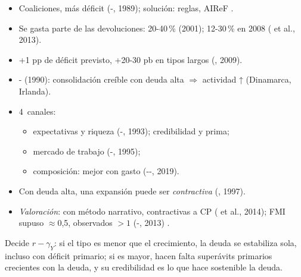 \documentclass{article}
\begin{document}
\begin{columnas}
\begin{itemize}
\begin{enumerate}
  \item \emph{deuda estratégica} (-, 1989; -, 1990);
  \item \emph{fondo común} (--, 1981): «lo que es de todos no es de nadie»;
  \item \emph{guerra de desgaste} (-, 1991); ciclo político (, 1975).
  \end{enumerate}
\item Coaliciones, más déficit (-, 1989); solución: reglas, AIReF .
\end{itemize}

\begin{itemize}
\item Se gasta parte de las devoluciones: 20-40\,\% (2001); 12-30\,\% en 2008 ( et al., 2013).
\item +1 pp de déficit previsto, +20-30 pb en tipos largos (, 2009).
\end{itemize}
\begin{itemize}
\item {}- (1990): consolidación creíble con deuda alta $\Rightarrow$ actividad ↑ (Dinamarca, Irlanda).
\item 4~canales:
  \begin{itemize}
  \item expectativas y riqueza (-, 1993); credibilidad y prima;
  \item mercado de trabajo (-, 1995);
  \item composición: mejor con gasto (--, 2019).
  \end{itemize}
\item Con deuda alta, una expansión puede ser \emph{contractiva} (, 1997).
\item \emph{Valoración}: con método narrativo, contractivas a CP ( et al., 2014); FMI supuso $\approx$0,5, observados $>1$ (-, 2013) .
\end{itemize}

\begin{ideaclave}
Decide $r-\gamma_Y$: si el tipo es menor que el crecimiento, la deuda se estabiliza sola, incluso con déficit primario; si es mayor, hacen falta superávits primarios crecientes con la deuda, y su credibilidad es lo que hace sostenible la deuda.
\end{ideaclave}


\end{columnas}
\end{document}
